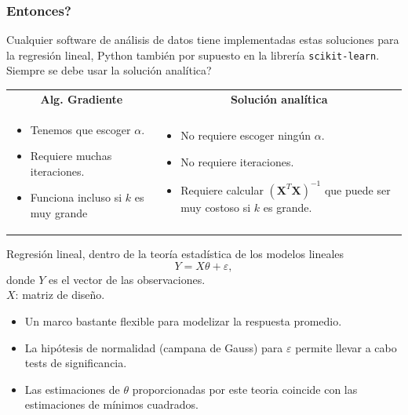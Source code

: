 \documentclass[aspectratio=169]{beamer}
\begin{document}
\begin{frame}\frametitle{Entonces?}
Cualquier software de análisis de datos tiene implementadas estas
soluciones para la regresión lineal, Python también por supuesto en
la librería {\tt scikit-learn}.\\ 
Siempre se debe usar la solución analítica?\\
\begin{tabular}{ll}
\multicolumn{1}{c}{\textbf{Alg. Gradiente}}&\multicolumn{1}{c}{\textbf{Solución analítica}}\\
\begin{minipage}{5cm}
\begin{itemize}
\item Tenemos que escoger $\alpha$.
\item Requiere muchas iteraciones.
\item Funciona incluso si $k$ es muy grande
\end{itemize}
\end{minipage}&    \begin{minipage}{5cm}
\begin{itemize}
\item No requiere escoger ningún $\alpha$.
\item No requiere iteraciones.
\item Requiere calcular $\left(\mathbf{X}^T\mathbf{X}\right)^{-1}$ que puede ser muy costoso si $k$ es grande. 
\end{itemize}
\end{minipage}
\end{tabular}
\end{frame}
\begin{frame}{Regresión lineal, dentro de la teoría estadística de los modelos lineales}
$$Y=X\theta+\varepsilon,$$
donde $Y$ es el vector de las observaciones.\\
$X$: matriz de diseño.
\begin{itemize}
\item Un marco bastante flexible para modelizar la respuesta promedio.
\item<3-> La hipótesis de normalidad (campana de Gauss) para $\varepsilon$ permite llevar a cabo tests de significancia.
\item<4-> Las estimaciones de $\theta$ proporcionadas por este teoria coincide con las estimaciones de mínimos cuadrados.
\end{itemize}
\end{frame}
\end{document}
